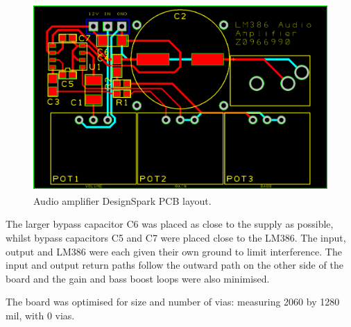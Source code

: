 \documentclass[a4paper,10pt]{article}
\newcommand{\DesignSparkPcb}{DesignSpark
	PCB\textsuperscript{\textregistered}\xspace}
\begin{document}
\begin{figure}
	\centering
	\includegraphics[width=\textwidth]{img/audio_amplifier_pcb.png}
	\caption{Audio amplifier \DesignSparkPcb layout.}
	\label{fig:pcb}
\end{figure}

The larger bypass capacitor C6 was placed as close to the supply as
possible, whilst bypass capacitors C5 and C7 were placed close to the
LM386. The input, output and LM386 were each given their own ground to limit 
interference. The input and output return paths follow the outward path on the 
other side of the board and the gain and bass boost loops were also minimised.

The board was optimised for size and number of vias: measuring 2060 by 1280 mil,
with 0 vias.

\FloatBarrier
\printbibliography
\end{document}
